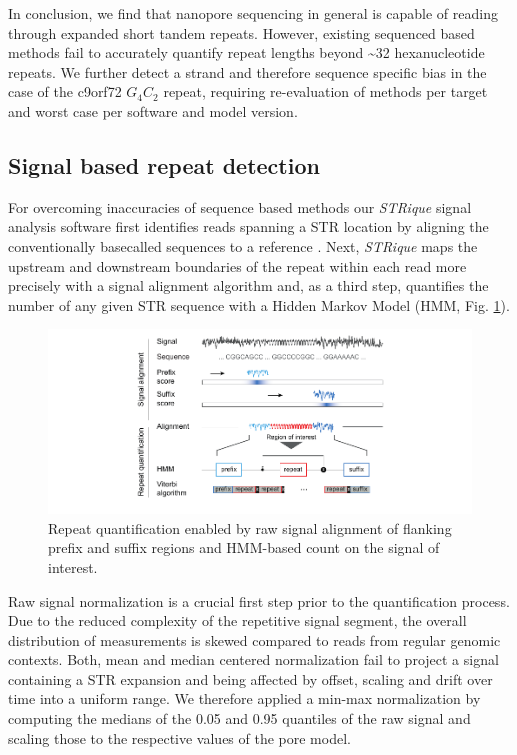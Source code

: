In conclusion, we find that nanopore sequencing in general is capable of reading through expanded short tandem repeats. However, existing sequenced based methods fail to accurately quantify repeat lengths beyond \textasciitilde32 hexanucleotide repeats. We further detect a strand and therefore sequence specific bias in the case of the c9orf72 $ G_{4}C_{2} $ repeat, requiring re-evaluation of methods per target and worst case per software and model version.




\subsection{Signal based repeat detection}
\label{subsec:strique:sig_repeat_counts}

For overcoming inaccuracies of sequence based methods our \textit{STRique} signal analysis software first identifies reads spanning a STR location by aligning the conventionally basecalled sequences to a reference \cite{Li2018}. Next, \textit{STRique} maps the upstream and downstream boundaries of the repeat within each read more precisely with a signal alignment algorithm and, as a third step, quantifies the number of any given STR sequence with a Hidden Markov Model (HMM, Fig. \ref{fig:strique:count_structure_plasmid}). 

\begin{figure}[h]
	\centering
	\includegraphics[width=1.0\textwidth]{figures/strique/count_structure_plasmid.pdf}
	\captionsetup{format=plain}
	\caption[\textit{STRique}: generic repeat detection pipeline on raw nanopore signals]{Repeat quantification enabled by raw signal alignment of flanking prefix and suffix regions and HMM-based count on the signal of interest.}
	\label{fig:strique:count_structure_plasmid}
\end{figure}

Raw signal normalization is a crucial first step prior to the quantification process. Due to the reduced complexity of the repetitive signal segment, the overall distribution of measurements is skewed compared to reads from regular genomic contexts. Both, mean and median centered normalization fail to project a signal containing a STR expansion and being affected by offset, scaling and drift over time into a uniform range. 
We therefore applied a min-max normalization by computing the medians of the 0.05 and 0.95 quantiles of the raw signal and scaling those to the respective values of the pore model.

